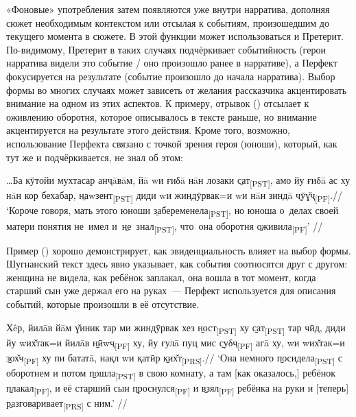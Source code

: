 {{{«Фоновые» употребления затем появляются уже внутри нарратива, дополняя сюжет необходимым контекстом или отсылая к событиям, произошедшим до текущего момента в сюжете. В этой функции может использоваться и Претерит. По-видимому, Претерит в таких случаях подчёркивает событийность (герои нарратива видели это событие / оно произошло ранее в нарративе), а Перфект фокусируется на результате (событие произошло до начала нарратива). Выбор формы во многих случаях может зависеть от желания рассказчика акцентировать внимание на одном из этих аспектов. К примеру, отрывок () отсылает к оживлению оборотня, которое описывалось в тексте раньше, но внимание акцентируется на результате этого действия. Кроме того, возможно, использование Перфекта связано с точкой зрения героя (юноши), который, как тут же и подчёркивается, не знал об этом:

\begingl
\gla …Ба кӯтойи мухтасар анҷāвāм, йā wи ғиδā нāн лозаки \b{сат}\textsubscript{[PST]}, амо йу ғиδā ас ху нāн кор бехабар, \b{наwзент}\textsubscript{[PST]} диди wи жиндӯрвак=и wи нāн зиндā \b{чӯɣ̌ҷ}\textsubscript{[PF]}.//
\glft ‘Короче говоря, мать этого юноши \b{забеременела}\textsubscript{[PST]}, но юноша о~делах своей матери понятия не~имел и~\b{не~знал}\textsubscript{[PST]}, что~она оборотня \b{оживила}\textsubscript{[PF]}’ //
\endgl \xe

Пример () хорошо демонстрирует, как эвиденциальность влияет на выбор формы. Шугнанский текст здесь явно указывает, как события соотносятся друг с другом: женщина не видела, как ребёнок заплакал, она вошла в тот момент, когда старший сын уже держал его на руках~— Перфект используется для описания событий, которые произошли в её отсутствие.

\begingl
\gla Хêр, йилāв йāм ɣ̌иник тар ми жиндӯрвак хез \b{ност}\textsubscript{[PST]} ху \b{сат}\textsubscript{[PST]} тар чӣд, диди йу wих̌так=и йилāв \b{нӣwҷ}\textsubscript{[PF]} ху, йу ғулā пуц мис \b{суδҷ}\textsubscript{[PF]} агā ху, wи wих̌так=и \b{зох̌ч}\textsubscript{[PF]} ху пи бататā, нақл wи қатӣр \b{ких̌т}\textsubscript{[PRS]}.//
\glft ‘Она немного \b{посидела}\textsubscript{[PST]} с оборотнем и потом \b{пошла}\textsubscript{[PST]} в свою комнату, а там [как оказалось,] ребёнок \b{плакал}\textsubscript{[PF]}, и её старший сын \b{проснулся}\textsubscript{[PF]} и \b{взял}\textsubscript{[PF]} ребёнка на руки и [теперь] \b{разговаривает}\textsubscript{[PRS]} с ним.’ //
\endgl \xe

}}}
